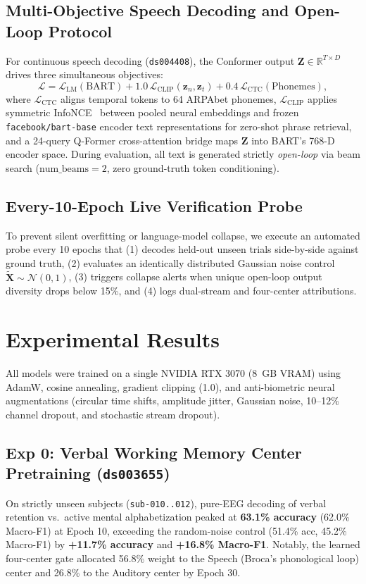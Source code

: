 \documentclass[journal]{IEEEtran}
\begin{document}
\subsection{Multi-Objective Speech Decoding and Open-Loop Protocol}
For continuous speech decoding (\texttt{ds004408}), the Conformer output $\mathbf{Z} \in \mathbb{R}^{T \times D}$ drives three simultaneous objectives:
\begin{equation}
    \mathcal{L} = \mathcal{L}_{\text{LM}}(\text{BART}) + 1.0\,\mathcal{L}_{\text{CLIP}}(\mathbf{z}_n, \mathbf{z}_t) + 0.4\,\mathcal{L}_{\text{CTC}}(\text{Phonemes}),
\end{equation}
where $\mathcal{L}_{\text{CTC}}$ aligns temporal tokens to 64 ARPAbet phonemes, $\mathcal{L}_{\text{CLIP}}$ applies symmetric InfoNCE~\cite{radford2021learning} between pooled neural embeddings and frozen \texttt{facebook/bart-base} encoder text representations for zero-shot phrase retrieval, and a 24-query Q-Former cross-attention bridge maps $\mathbf{Z}$ into BART's 768-D encoder space. During evaluation, all text is generated strictly \emph{open-loop} via beam search ($\text{num\_beams}=2$, zero ground-truth token conditioning).

\subsection{Every-10-Epoch Live Verification Probe}
To prevent silent overfitting or language-model collapse, we execute an automated probe every 10 epochs that (1) decodes held-out unseen trials side-by-side against ground truth, (2) evaluates an identically distributed Gaussian noise control $\tilde{\mathbf{X}} \sim \mathcal{N}(0, 1)$, (3) triggers collapse alerts when unique open-loop output diversity drops below 15\%, and (4) logs dual-stream and four-center attributions.

\section{Experimental Results}
All models were trained on a single NVIDIA RTX 3070 (8~GB VRAM) using AdamW, cosine annealing, gradient clipping (1.0), and anti-biometric neural augmentations (circular time shifts, amplitude jitter, Gaussian noise, 10--12\% channel dropout, and stochastic stream dropout).

\subsection{Exp 0: Verbal Working Memory Center Pretraining (\texttt{ds003655})}
On strictly unseen subjects (\texttt{sub-010..012}), pure-EEG decoding of verbal retention vs.\ active mental alphabetization peaked at \textbf{63.1\% accuracy} (62.0\% Macro-F1) at Epoch 10, exceeding the random-noise control (51.4\% acc, 45.2\% Macro-F1) by \textbf{+11.7\% accuracy} and \textbf{+16.8\% Macro-F1}. Notably, the learned four-center gate allocated 56.8\% weight to the Speech (Broca's phonological loop) center and 26.8\% to the Auditory center by Epoch 30.
\end{document}
